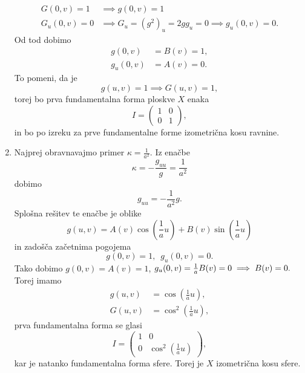 \begin{enumerate}
\begin{align*}
            G(0,v)  = 1 &\implies g(0,v) = 1 \\
            G_u(0,v)  = 0 &\implies G_u = (g^2)_u = 2gg_u = 0 \implies g_u(0, v) = 0.
        \end{align*} 
        Od tod dobimo \begin{align*}
            g(0,v) &= B(v) = 1, \\
            g_u(0,v) &= A(v) = 0.
        \end{align*}
        To pomeni, da je \begin{equation*}
        g(u,v) = 1 \implies G(u, v) = 1,
        \end{equation*}  
        torej bo prva fundamentalna forma ploskve $X$ enaka \begin{equation*}
        I = \begin{pmatrix}
        1 & 0 \\
        0 & 1
        \end{pmatrix},
        \end{equation*}  
        in bo po izreku za prve fundamentalne forme izometrična kosu ravnine.
\item Najprej obravnavajmo primer $\kappa = \frac{1}{a^2}.$ Iz enačbe \begin{equation*}
\kappa = - \frac{g_{uu}}{g} = \frac{1}{a^2}
\end{equation*}  
dobimo \begin{equation*}
g_{uu} = -\frac{1}{a^2} g.
\end{equation*}
Splošna rešitev te enačbe je oblike \begin{equation*}
g(u,v) = A(v) \cos (\frac{1}{a} u) + B(v) \sin(\frac{1}{a} u)
\end{equation*}in zadošča začetnima pogojema \begin{equation*}
g(0, v) = 1, \,\,\, g_u(0, v) = 0.
\end{equation*}  
Tako dobimo $g(0, v) = A(v) = 1$, $g_u(0,v) = \frac{1}{a} B(v) = 0 \implies B(v)  = 0.\\$
Torej imamo \begin{align*}
    g(u,v) &= \cos (\frac{1}{a} u),  \\
    G(u,v) &= \cos^2 \left(\frac{1}{a} u\right),
\end{align*}
prva fundamentalna forma se glasi \begin{equation*}
I = \begin{pmatrix}
1 & 0 \\
0 & \cos^2 (\frac{1}{a} u)
\end{pmatrix},
\end{equation*}  
kar je natanko fundamentalna forma sfere. Torej je $X$ izometrična kosu sfere. 


\end{enumerate}
